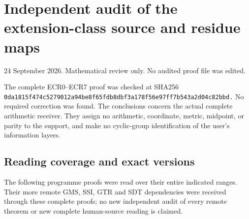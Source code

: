 \section{Independent audit of the extension-class source and residue
maps}\label{independent-audit-of-the-extension-class-source-and-residue-maps}

24 September 2026. Mathematical review only. No audited proof file was
edited.

The complete ECR0--ECR7 proof was checked at SHA256
\nolinkurl{0da1815f474c5279012a94be8f65fdb8dbf3a178f56e97ff7b543a2d04c82bbd.}
No required correction was found. The conclusions concern the actual
complete arithmetic receiver. They assign no arithmetic, coordinate,
metric, midpoint, or parity to the support, and make no cyclic-group
identification of the user's information layers.

\subsection{Reading coverage and exact
versions}\label{reading-coverage-and-exact-versions}

The following programme proofs were read over their entire indicated
ranges. Their more remote GMS, SSI, GTR and SDT dependencies were
received through these complete proofs; no new independent audit of
every remote theorem or new complete human-source reading is claimed.

